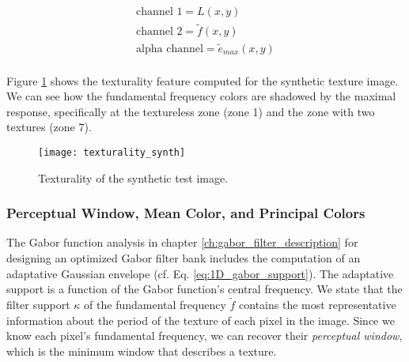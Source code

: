 \begin{gather}
    \text{channel 1} = L(x,y) \\
    \text{channel 2} = \widetilde{f}(x,y) \\
    \text{alpha channel} = \widetilde{e}_{max}(x,y) \\
\end{gather}

Figure \ref{fig:texturality_synth} shows the texturality feature computed for the synthetic texture image. We can see how the fundamental frequency colors are shadowed by the maximal response, specifically at the textureless zone (zone 1) and the zone with two textures (zone 7).

\begin{figure}[!ht]
	\texttt{[image: texturality\_synth]}
    \caption{Texturality of the synthetic test image.}
    \label{fig:texturality_synth}
\end{figure}

%                  

\subsubsection{Perceptual Window, Mean Color, and Principal Colors}
The Gabor function analysis in chapter \ref{ch:gabor_filter_description} for designing an optimized Gabor filter bank includes the computation of an adaptative Gaussian envelope (cf. Eq. \eqref{eq:1D_gabor_support}). The adaptative support is a function of the Gabor function's central frequency. We state that the filter support $\kappa$ of the fundamental frequency $\widetilde{f}$ contains the most representative information about the period of the texture of each pixel in the image. Since we know each pixel's fundamental frequency, we can recover their \textit{perceptual window}, which is the minimum window that describes a texture.

